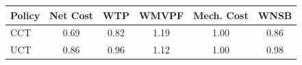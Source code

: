 \begin{tabular}{|p{4.05em}ccccc|}
\hline
\rowcolor[rgb]{ .851,  .851,  .851} \textbf{Policy} & \multicolumn{1}{p{4.05em}}{\textbf{Net Cost}} & \multicolumn{1}{p{4.05em}}{\textbf{WTP}} & \multicolumn{1}{p{4.05em}}{\textbf{WMVPF}} & \multicolumn{1}{p{5.35em}}{\textbf{Mech. Cost}} & \multicolumn{1}{p{4.05em}|}{\textbf{WNSB}} \bigstrut\\
\hline
CCT   & 0.69  & 0.82  & 1.19  & 1.00  & 0.86 \bigstrut\\
\hline
UCT   & 0.86  & 0.96  & 1.12  & 1.00  & 0.98 \bigstrut\\
\hline
\end{tabular}%
